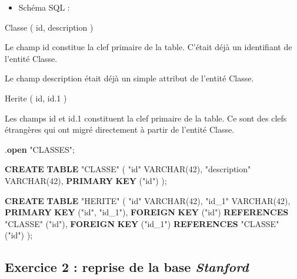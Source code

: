 \documentclass[11pt]{article}
\providecommand{\tightlist}{%
      \setlength{\itemsep}{0pt}\setlength{\parskip}{0pt}}
\newenvironment{Shaded}{}{}
\newcommand{\KeywordTok}[1]{\textcolor[rgb]{0.00,0.44,0.13}{\textbf{{#1}}}}
\newcommand{\DataTypeTok}[1]{\textcolor[rgb]{0.56,0.13,0.00}{{#1}}}
\newcommand{\DecValTok}[1]{\textcolor[rgb]{0.25,0.63,0.44}{{#1}}}
\newcommand{\OtherTok}[1]{\textcolor[rgb]{0.00,0.44,0.13}{{#1}}}
\newcommand{\NormalTok}[1]{{#1}}
\begin{document}
\begin{itemize}
\tightlist
\item
  Schéma SQL :
\end{itemize}

\hypertarget{mld}{}
{Classe} ( {id}, {description} )

Le champ id constitue la clef primaire de la table. C'était déjà un
identifiant de l'entité Classe.

Le champ description était déjà un simple attribut de l'entité Classe.

{Herite} ( {id}, {id.1} )

Les champs id et id.1 constituent la clef primaire de la table. Ce sont
des clefs étrangères qui ont migré directement à partir de l'entité
Classe.

\begin{Shaded}
\begin{Highlighting}[]
\NormalTok{.}\KeywordTok{open} \OtherTok{"CLASSES"}\NormalTok{;}

\KeywordTok{CREATE} \KeywordTok{TABLE} \OtherTok{"CLASSE"}\NormalTok{ (}
  \OtherTok{"id"} \DataTypeTok{VARCHAR}\NormalTok{(}\DecValTok{42}\NormalTok{),}
  \OtherTok{"description"} \DataTypeTok{VARCHAR}\NormalTok{(}\DecValTok{42}\NormalTok{),}
  \KeywordTok{PRIMARY} \KeywordTok{KEY}\NormalTok{ (}\OtherTok{"id"}\NormalTok{)}
\NormalTok{);}

\KeywordTok{CREATE} \KeywordTok{TABLE} \OtherTok{"HERITE"}\NormalTok{ (}
  \OtherTok{"id"} \DataTypeTok{VARCHAR}\NormalTok{(}\DecValTok{42}\NormalTok{),}
  \OtherTok{"id\_1"} \DataTypeTok{VARCHAR}\NormalTok{(}\DecValTok{42}\NormalTok{),}
  \KeywordTok{PRIMARY} \KeywordTok{KEY}\NormalTok{ (}\OtherTok{"id"}\NormalTok{, }\OtherTok{"id\_1"}\NormalTok{),}
  \KeywordTok{FOREIGN} \KeywordTok{KEY}\NormalTok{ (}\OtherTok{"id"}\NormalTok{) }\KeywordTok{REFERENCES} \OtherTok{"CLASSE"}\NormalTok{ (}\OtherTok{"id"}\NormalTok{),}
  \KeywordTok{FOREIGN} \KeywordTok{KEY}\NormalTok{ (}\OtherTok{"id\_1"}\NormalTok{) }\KeywordTok{REFERENCES} \OtherTok{"CLASSE"}\NormalTok{ (}\OtherTok{"id"}\NormalTok{)}
\NormalTok{);}
\end{Highlighting}
\end{Shaded}

    \hypertarget{exercice-2-reprise-de-la-base-stanford}{%
\subsection{\texorpdfstring{Exercice 2 : reprise de la base
\emph{Stanford}}{Exercice 2 : reprise de la base Stanford}}\label{exercice-2-reprise-de-la-base-stanford}}
\end{document}

